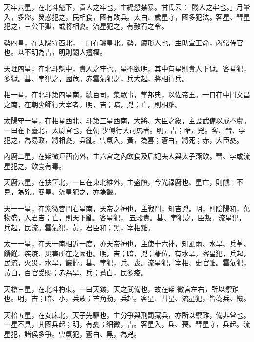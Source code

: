 \begin{pinyinscope}
 天牢六星，在北斗魁下，貴人之牢也，主繩愆禁暴。甘氏云：「賤人之牢也。」月暈入，多盜。熒惑犯之，民相食，國有敗兵。太白、歲星守，國多犯法。客星、彗星犯之，三公下獄，或將相憂。流星犯之，有赦宥之令。



 勢四星，在太陽守西北，一曰在璣星北。勢，腐形人也，主助宣王命，內常侍官也。以不明為吉，明則閹人擅權。



 天理四星，在北斗魁中，貴人之牢也。星不欲明，其中有星則貴人下獄。客星犯，多獄。彗、孛犯之，國危。赤雲氣犯之，兵大起，將相行兵。



 相一星，在北斗第四星南，總百司，集眾事，掌邦典，以佐帝王。一曰在中鬥文昌之南，在朝少師行大宰者。明，吉；暗，兇；亡，則相黜。



 太陽守一星，在相星西北、斗第三星西南，大將、大臣之象，主設武備以戒不虞。一曰在下臺北，太尉官也，在朝
 少傅行大司馬者。明，吉；暗，兇。客、彗、孛犯之，為易政，將相憂，兵亂。雲氣入，黃，為喜；蒼白，將死；赤，大臣憂。



 內廚二星，在紫微垣西南外，主六宮之內飲食及后妃夫人與太子燕飲。彗、孛或流星犯之，飲食有毒。



 天廚六星，在扶筐北，一曰在東北維外，主盛饌，今光祿廚也。星亡，則饑；不見，為兇。客星、流星犯之，亦為饑。



 天一一星，在紫微宮門右星南，天帝之神也，主戰鬥，知吉兇。明，則陰陽和，萬物盛，人君吉；亡，則天下亂。客星犯，
 五穀貴。彗、孛犯之，臣叛。流星犯，兵起，民流。雲氣犯，黃，君臣和；黑，宰相黜。



 太一一星，在天一南相近一度，亦天帝神也，主使十六神，知風雨、水旱、兵革、饑饉、疾疫、災害所在之國也。明，吉；暗，兇；離位，有水旱。客星犯，兵起，民流，火災，水旱，饑饉。彗、孛犯，兵、喪。流星犯，宰相、史官黜。雲氣犯，黃白，百官受賜；赤為旱、兵；蒼白，民多疫。



 天槍三星，在北斗杓東。一曰天鉞，天之武備也，故在紫
 微宮左右，所以禦難也。明，吉；暗、小，兵敗；芒角動，兵起。客星、彗星、流星犯，皆為兵、饑。



 天棓五星，在女床北，天子先驅也，主分爭與刑罰藏兵，亦所以禦難，備非常也。一星不具，其國兵起；明，有憂；細微，吉。客星入，兵、喪。彗星守，兵起。流星犯，諸侯多爭。雲氣犯，蒼白、黑，為兇。




\end{pinyinscope}
